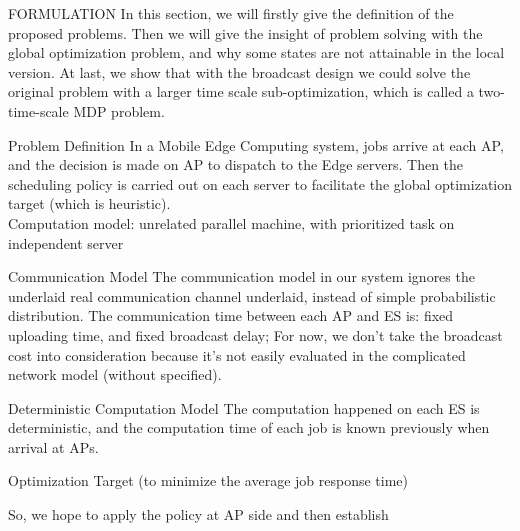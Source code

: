 \documentclass[10pt, conference, letterpaper]{IEEEtran}
\begin{document}
    \begin{section}{FORMULATION}
        \label{sec:formulation}
        In this section, we will firstly give the definition of the proposed problems. Then we will give the insight of problem solving with the global optimization problem, and why some states are not attainable in the local version. At last, we show that with the broadcast design we could solve the original problem with a larger time scale sub-optimization, which is called a two-time-scale MDP problem.

        \begin{subsection}{Problem Definition}
            In a Mobile Edge Computing system, jobs arrive at each AP, and the decision is made on AP to dispatch to the Edge servers. Then the scheduling policy is carried out on each server to facilitate the global optimization target (which is heuristic).
            \\
            Computation model: unrelated parallel machine, with prioritized task on independent server

            \begin{subsubsection}{Communication Model}
                The communication model in our system ignores the underlaid real communication channel underlaid, instead of simple probabilistic distribution.
                The communication time between each AP and ES is: fixed uploading time, and fixed broadcast delay;
                For now, we don't take the broadcast cost into consideration because it's not easily evaluated in the complicated network model (without specified).
            \end{subsubsection}

            \begin{subsubsection}{Deterministic Computation Model}
                The computation happened on each ES is deterministic, and the computation time of each job is known previously when arrival at APs.
            \end{subsubsection}

            \begin{subsubsection}{Optimization Target}
                (to minimize the average job response time)
            \end{subsubsection}

            So, we hope to apply the policy at AP side and then establish
        \end{subsection}


\end{section}
\end{document}

